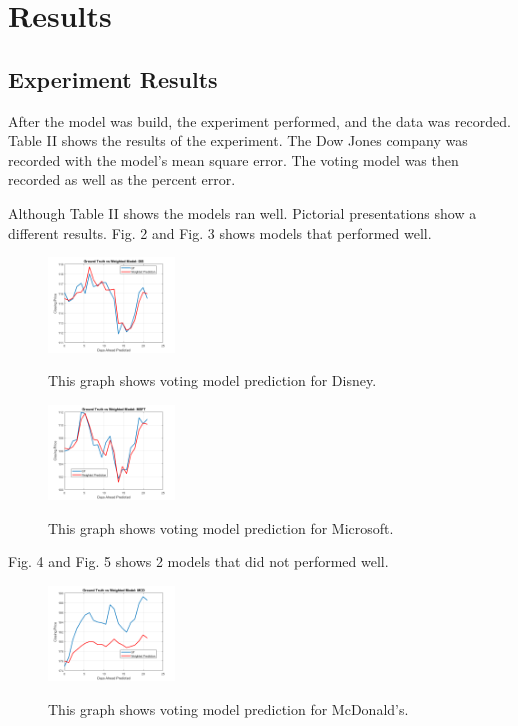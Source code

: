 \documentclass[journal]{IEEEtran}
\begin{document}
\section{Results}
\subsection*{Experiment Results}
After the model was build, the experiment performed, and the data was recorded. Table II shows the results of the experiment. The Dow Jones company was recorded with the model's mean square error. The voting model was then recorded as well as the percent error.


Although Table II shows the models ran well. Pictorial presentations show a different results. Fig. 2 and Fig. 3 shows models that performed well.

\begin{figure}[H]
\centering
\includegraphics[width = 0.3\textwidth]{dis.png}
\label{dis}
\caption{This graph shows voting model prediction for Disney.}
\end{figure}

\begin{figure}[H]
\centering
\includegraphics[width = 0.3\textwidth]{msft.png}
\label{msft}
\caption{This graph shows voting model prediction for Microsoft.}
\end{figure}

Fig. 4 and Fig. 5 shows 2 models that did not performed well.

\begin{figure}[H]
\centering
\includegraphics[width = 0.3\textwidth]{mcd.png}
\label{dis}
\caption{This graph shows voting model prediction for McDonald's.}
\end{figure}
\end{document}
